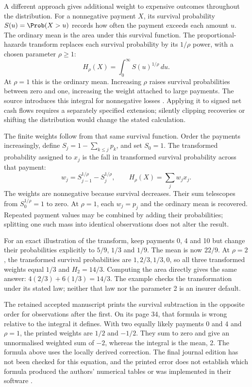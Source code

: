 A different approach gives additional weight to expensive outcomes throughout
the distribution. For a nonnegative payment $X$, its survival probability
$S(u)=\Prob(X>u)$ records how often the payment exceeds each amount $u$.
The ordinary mean is the area under this survival function. The
proportional-hazards transform replaces each survival probability by its
$1/\rho$ power, with a chosen parameter $\rho\geq1$:
\[
 H_\rho(X)=\int_0^\infty S(u)^{1/\rho}\,du.
\]
At $\rho=1$ this is the ordinary mean. Increasing $\rho$ raises survival
probabilities between zero and one, increasing the weight attached to large
payments. The source introduces this integral for nonnegative losses
\citep[Appendix 2]{england2019lifetime}. Applying it to signed net cash flows
requires a separately specified extension; silently clipping recoveries or
shifting the distribution would change the stated calculation.

The finite weights follow from that same survival function. Order the
payments increasingly, define $S_j=1-\sum_{k\leq j}p_k$, and set $S_0=1$.
The transformed probability assigned to $x_j$ is the fall in transformed
survival probability across that payment:
\[
 w_j=S_{j-1}^{1/\rho}-S_j^{1/\rho},\qquad
 H_\rho(X)=\sum_jw_jx_j.
\]
The weights are nonnegative because survival decreases. Their sum telescopes
from $S_0^{1/\rho}=1$ to zero. At $\rho=1$, each $w_j=p_j$ and the ordinary
mean is recovered. Repeated payment values may be combined by adding their
probabilities; splitting one such mass into identical observations does not
alter the result.

For an exact illustration of the transform, keep payments 0, 4 and 10 but
change their probabilities explicitly to $5/9$, $1/3$ and $1/9$. The mean is
now $22/9$. At $\rho=2$, the transformed survival probabilities are
$1,2/3,1/3,0$, so all three transformed weights equal $1/3$ and
$H_2=14/3$. Computing the area directly gives the same answer:
$4(2/3)+6(1/3)=14/3$. The example checks the transformation under its stated
law; neither that law nor the parameter 2 is an insurer default.

The retained accepted manuscript prints the survival subtraction in the
opposite order for observations after the first. On its page 34, that formula
is wrong relative to the integral it defines. With two equally likely
payments 0 and 4 and $\rho=1$, the printed weights are $1/2$ and $-1/2$.
They sum to zero and give an unnormalised weighted sum of $-2$, whereas the
integral is the mean, 2. The formula above uses the locally derived correction.
The final journal edition has not been checked for this equation, and the
printed error does not establish which formula produced the authors'
numerical tables or was implemented in their software
\citep[Appendix 2, p.\ 34]{england2019lifetime}.

